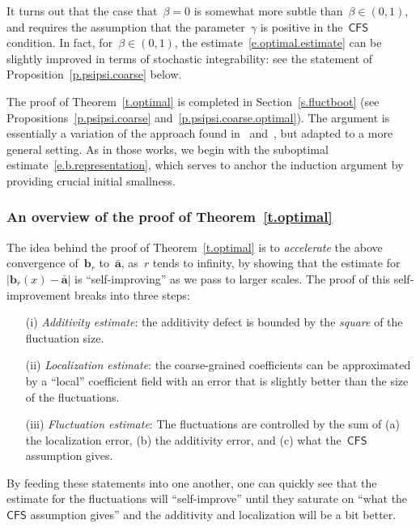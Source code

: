 \documentclass[11pt,twoside]{article} %
\numberwithin{equation}{section}
\theoremstyle{definition}
\renewcommand{\b}{\ensuremath{\mathbf{b}}}
\renewcommand{\a}{\mathbf{a}}
\newcommand{\ahom}{\bar{\a}}
\newcommand{\CFS}{\mathsf{CFS}}
\begin{document}
\smallskip

It turns out that the case that~$\beta = 0$ is somewhat more subtle than~$\beta\in (0,1)$, and requires the assumption that the parameter~$\gamma$ is positive in the~$\CFS$ condition. In fact, for~$\beta\in (0,1)$, the estimate~\eqref{e.optimal.estimate} can be slightly improved in terms of stochastic integrability: see the statement of Proposition~\ref{p.psipsi.coarse} below. 

\smallskip

The proof of Theorem~\ref{t.optimal} is completed in Section~\ref{s.fluctboot} (see Propositions~\ref{p.psipsi.coarse} and~\ref{p.psipsi.coarse.optimal}). The argument is essentially a variation of the approach found in~\cite{AKM} and~\cite[Chapter 4]{AKMBook}, but adapted to a more general setting. As in those works, we begin with the suboptimal estimate~\eqref{e.b.representation}, which serves to anchor the induction argument by providing crucial initial smallness.


\subsubsection{An overview of the proof of Theorem~\ref{t.optimal}}

The idea behind the proof of Theorem~\ref{t.optimal} is to \emph{accelerate} the above convergence of~$\b_r$ to~$\ahom$, as~$r$ tends to infinity, by showing that the estimate for~$\big| \b_r(x) - \ahom \big|$ is ``self-improving'' as we pass to larger scales. The proof of this self-improvement breaks into three steps: 

\begin{enumerate}
\item[(i)] \emph{Additivity estimate}: the additivity defect is bounded by the \emph{square} of the fluctuation size. 

\item[(ii)] \emph{Localization estimate}: the coarse-grained coefficients can be approximated by a ``local'' coefficient field with an error that is slightly better than the size of the fluctuations. 

\item[(iii)] \emph{Fluctuation estimate}: The fluctuations are controlled by the sum of (a) the localization error, (b) the additivity error, and (c) what the~$\CFS$ assumption gives.
 
\end{enumerate}
By feeding these statements into one another, one can quickly see that the estimate for the fluctuations will ``self-improve'' until they saturate on ``what the~$\CFS$ assumption gives'' and the additivity and localization will be a bit better. 
\end{document}
